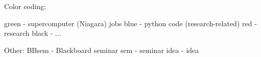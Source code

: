Color coding:

green - supercomputer (Niagara) jobs
blue - python code (research-related)
red - research
black - ...

Other:
BBsem - Blackboard seminar
sem - seminar
idea - idea
